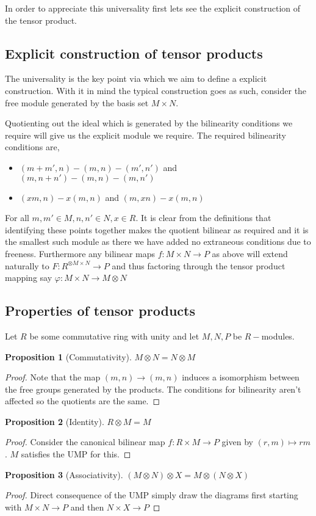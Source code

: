 \documentclass[12pt]{article}
\numberwithin{equation}{section}
\newtheorem{proposition}{Proposition}[section]
\begin{document}
	
	In order to appreciate this universality first lets see the explicit construction of the tensor product.
	\subsection{Explicit construction of tensor products}
	The universality is the key point via which we aim to define a explicit construction. With it in mind the typical construction goes as such, consider the free module generated by the basis set $M \times N$. 
	
	Quotienting out the ideal which is generated by the bilinearity conditions we require will give us the explicit module we require. The required bilinearity conditions are,
	\begin{itemize}
		\item $(m+m', n)-(m,n)-(m',n')$ and $(m,n+n')-(m,n)-(m,n')$
		\item $(xm,n)-x(m,n)$ and $(m,xn)-x(m,n)$
	\end{itemize}
	For all $m,m'\in M, n,n' \in N, x \in R$. It is clear from the definitions that identifying these points together makes the quotient bilinear as required and it is the smallest such module as there we have added no extraneous conditions due to freeness. Furthermore any bilinear maps $f: M\times N \to P$ as above will extend naturally to $F: R^{\otimes M\times N} \to P$ and thus factoring through the tensor product mapping say $\varphi: M\times N \to M \otimes N$
	

	
	\subsection{Properties of tensor products}
	Let $R$ be some commutative ring with unity and let $M,N,P$ be $R-$modules.
	\begin{proposition}[Commutativity]
		$M \otimes N = N\otimes M$
	\end{proposition}
	\begin{proof}
		Note that the map $ (m,n)\to(m,n)$ induces a isomorphism between the free groups generated by the products. The conditions for bilinearity aren't affected so the quotients are the same.
	\end{proof}
	\begin{proposition}[Identity]
		$R \otimes M = M$
	\end{proposition}
	\begin{proof}
		Consider the canonical bilinear map $f: R \times M \to P$ given by $(r,m)\mapsto rm$. $M$ satisfies the UMP for this.
	\end{proof}
	\begin{proposition}[Associativity]
		$(M \otimes N) \otimes X = M \otimes (N \otimes X)$	
	\end{proposition}
	\begin{proof}
		Direct consequence of the UMP simply draw the diagrams first starting with $M \times N \to P$ and then $N \times X \to P$
	\end{proof}
	
\end{document}
